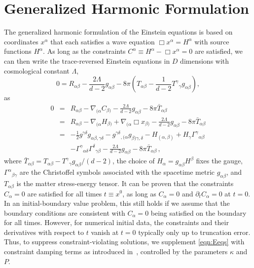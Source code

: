 \documentclass[aps,letterpaper,twocolumn,nofootinbib]{revtex4}
\numberwithin{equation}{section}
\begin{document}
\appendix
\setcounter{tocdepth}{1}
\section{Generalized Harmonic Formulation}
\label{sec:GHfor}

The generalized harmonic formulation of the Einstein equations is based on coordinates $x^\alpha$ that each satisfies a wave equation $\Box x^{\alpha}=H^\alpha$ with source functions $H^\alpha$.
As long as the constraints $C^\alpha \equiv H^\alpha-\Box x^\alpha=0$ are satisfied,
we can then write the trace-reversed Einstein equations in $D$ dimensions with cosmological constant $\Lambda$,
\begin{equation}
0=R_{\alpha\beta} - \frac{2\Lambda}{d-2} g_{\alpha\beta} - 8\pi\left( T_{\alpha\beta} - \frac{1}{d-2} {T^\gamma}_\gamma g_{\alpha\beta} \right),
\end{equation}
as
\begin{eqnarray}
0
&=& R_{\alpha\beta} - \nabla_{(\alpha} C_{\beta)} - \frac{2\Lambda}{d-2} g_{\alpha\beta} - 8\pi \bar{T}_{\alpha\beta} \nonumber \\
&=& R_{\alpha\beta} - \nabla_{(\alpha} H_{\beta)} + \nabla_{(\alpha} \Box{x}_{\beta)} - \frac{2\Lambda}{d-2} g_{\alpha\beta} - 8\pi \bar{T}_{\alpha\beta} \nonumber \\
&=& -\frac{1}{2} g^{\gamma\delta} g_{\alpha\beta,\gamma\delta} - g^{\gamma\delta}{}_{,(\alpha}g_{\beta)\gamma,\delta} - H_{(\alpha,\beta)} + H_\gamma \Gamma^\gamma{}_{\alpha\beta} \nonumber \\
&&- \Gamma^\gamma{}_{\alpha\delta}\Gamma^\delta{}_{\gamma\beta} - \frac{2\Lambda}{d-2} g_{\alpha\beta} - 8\pi \bar{T}_{\alpha\beta}\,, \label{eqn:Eeqs} 
\end{eqnarray}
where $\bar{T}_{\alpha\beta} = T_{\alpha\beta} - {T^\gamma}_\gamma g_{\alpha\beta}/(d-2)$, the choice of $H_\alpha = g_{\alpha\beta} H^\beta$ fixes the gauge, $\Gamma^\alpha{}_{\beta\gamma}$ are the Christoffel symbols associated with
the spacetime metric $g_{\alpha\beta}$, and $T_{\alpha\beta}$ is the matter stress-energy tensor. 
It can be proven that the constraints $C_\alpha=0$ are satisfied for all times $t\equiv x^0$, as long as $C_\alpha=0$ and $\partial_{t}C_\alpha=0$ at $t=0$. In an initial-boundary value problem, this still holds if we assume that the boundary conditions are consistent with $C_\alpha=0$ being satisfied on the boundary for all times.
However, for numerical initial data, the constraints and their derivatives with respect to $t$ vanish at $t=0$ typically only up to truncation error. Thus, to suppress constraint-violating solutions, we supplement \eqref{eqn:Eeqs} with constraint damping terms as introduced in~\cite{Gundlach:2005eh}, controlled by the parameters $\kappa$ and $P$.
\end{document}
